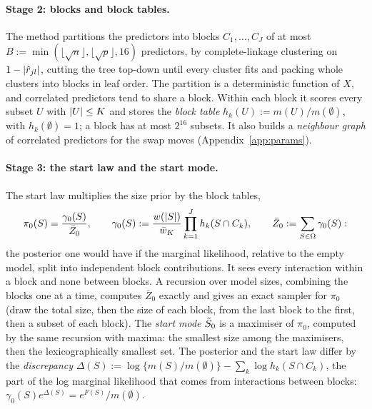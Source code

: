\paragraph{Stage 2: blocks and block tables.} The method partitions the predictors into blocks $C_1,\dots,C_J$ of at most
$B:=\min(\lfloor\sqrt n\rfloor,\lfloor\sqrt p\rfloor,16)$ predictors, by complete-linkage clustering on $1-\lvert \hat r_{jl}\rvert$,
cutting the tree top-down until every cluster fits and packing whole clusters into blocks in leaf order. The partition is a
deterministic function of $X$, and correlated predictors tend to share a block. Within each block it scores every subset
$U$ with $\lvert U\rvert\le K$ and stores the \emph{block table} $h_k(U):=m(U)/m(\emptyset)$, with $h_k(\emptyset)=1$; a block has
at most $2^{16}$ subsets. It also builds a \emph{neighbour graph} of correlated predictors for the swap moves
(Appendix~\ref{app:params}).

\paragraph{Stage 3: the start law and the start mode.} The start law multiplies the size prior by the block tables,
\begin{equation}\label{eq:startlaw}
  \pi_0(S)=\frac{\gamma_0(S)}{\bar Z_0},\qquad \gamma_0(S):=\frac{w(\lvert S\rvert)}{\bar w_K}\prod_{k=1}^J h_k(S\cap C_k),\qquad
  \bar Z_0:=\sum_{S\in\Omega}\gamma_0(S):
\end{equation}
the posterior one would have if the marginal likelihood, relative to the empty model, split into independent block
contributions. It sees every interaction within a block and none between blocks. A recursion over model sizes, combining
the blocks one at a time, computes $\bar Z_0$ exactly and gives an exact sampler for $\pi_0$ (draw the total size, then
the size of each block, from the last block to the first, then a subset of each block). The \emph{start mode} $\tilde S_0$ is a maximiser of $\pi_0$,
computed by the same recursion with maxima: the smallest size among the maximisers, then the lexicographically smallest
set. The posterior and the start law differ by the \emph{discrepancy}
$\Delta(S):=\log\{m(S)/m(\emptyset)\}-\sum_k\log h_k(S\cap C_k)$, the part of the log marginal likelihood that comes from
interactions between blocks: $\gamma_0(S)e^{\Delta(S)}=e^{F(S)}/m(\emptyset)$.

